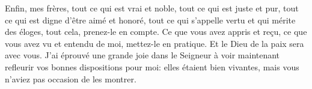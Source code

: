 Enfin, mes frères, tout ce qui est vrai et noble, tout ce qui est juste et pur,
	tout ce qui est digne d’être aimé et honoré,
	tout ce qui s’appelle vertu et qui mérite des éloges,
	tout cela, prenez-le en compte.
Ce que vous avez appris et reçu, ce que vous avez vu et entendu de moi,
	mettez-le en pratique.
	Et le Dieu de la paix sera avec vous.
J’ai éprouvé une grande joie dans le Seigneur
		à voir maintenant refleurir vos bonnes dispositions pour moi:
	elles étaient bien vivantes, mais vous n’aviez pas occasion de les montrer.
